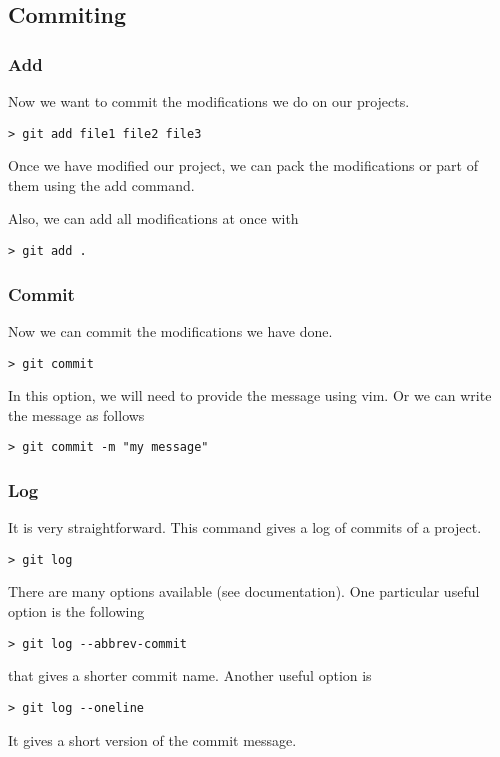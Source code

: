 \subsection{Commiting}

\subsubsection{Add} Now we want to commit the modifications we do on our projects.
\begin{verbatim}
> git add file1 file2 file3
\end{verbatim}
Once we have modified our project, we can pack the modifications or part 
of them using the add command. 

Also, we can add all modifications at once with 
\begin{verbatim}
> git add .
\end{verbatim}


\subsubsection{Commit}

Now we can commit the modifications we have done. 
\begin{verbatim}
> git commit
\end{verbatim}
In this option, we will need to provide the message using vim. 
Or we can write the message as follows
\begin{verbatim}
> git commit -m "my message"
\end{verbatim}

\subsubsection{Log}

It is very straightforward. This command gives a log of commits of a project. 
\begin{verbatim}
> git log    
\end{verbatim}

There are many options available (see documentation). One particular 
useful option is the following
\begin{verbatim}
> git log --abbrev-commit    
\end{verbatim}
that gives a shorter commit name. Another useful option is 
\begin{verbatim}
> git log --oneline    
\end{verbatim}
It gives a short version of the commit message.

